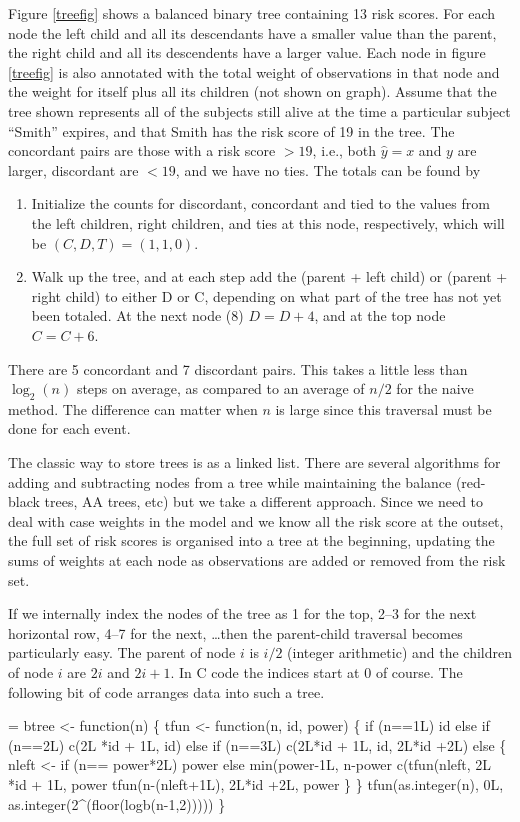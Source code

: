 \documentclass{article}
\begin{document}
Figure  \ref{treefig} shows a balanced binary tree containing  
13 risk scores.  For each node the left child and all its descendants
have a smaller value than the parent, the right child and all its
descendents have a larger value.
Each node in figure \ref{treefig} is also annotated with the total weight
of observations in that node and the weight for itself plus all its children 
(not shown on graph).  
Assume that the tree shown represents all of the subjects still alive at the
time a particular subject ``Smith'' expires, and that Smith has the risk score
of 19 in the tree.
The concordant pairs are those with a risk score $>19$, i.e., both $\hat y=x$
and $y$ are larger, discordant are $<19$, and we have no ties.
The totals can be found by
\begin{enumerate}
  \item Initialize the counts for discordant, concordant and tied to the
    values from the left children, right children, and ties at this node,
    respectively, which will be $(C,D,T) = (1,1,0)$.
  \item Walk up the tree, and at each step add the (parent + left child) or
    (parent + right child) to either D or C, depending on what part of the
    tree has not yet been totaled.  
    At the next node (8) $D= D+4$, and at the top node $C=C + 6$.
\end{enumerate}

There are 5 concordant and 7 discordant pairs.
This takes a little less than $\log_2(n)$ steps on average, as compared to an
average of $n/2$ for the naive method.  The difference can matter when $n$ is
large since this traversal must be done for each event.

The classic way to store trees is as a linked list.  There are several 
algorithms for adding and subtracting nodes from a tree while maintaining
the balance (red-black trees, AA trees, etc) but we take a different 
approach.  Since we need to deal with case weights in the model and we
know all the risk score at the outset, the full set of risk scores is
organised into a tree at the beginning, updating the sums of weights at
each node as observations are added or removed from the risk set.

If we internally index the nodes of the tree as 1 for the top, 
2--3 for the next 
horizontal row, 4--7 for the next, \ldots then the parent-child 
traversal becomes particularly easy.
The parent of node $i$ is $i/2$ (integer arithmetic) and the children of
node $i$ are $2i$ and $2i +1$.  In C code the indices start at 0 of course.
The following bit of code arranges data into such a tree.
\begin{nwchunk}
=
 btree <- function(n) \{
    tfun <- function(n, id, power) \{
        if (n==1L) id
        else if (n==2L) c(2L *id + 1L, id)
        else if (n==3L) c(2L*id + 1L, id, 2L*id +2L)
        else \{
            nleft <- if (n== power*2L) power  else min(power-1L, n-power%
            c(tfun(nleft, 2L *id + 1L, power%
              tfun(n-(nleft+1L), 2L*id +2L, power%
        \}
    \}
    tfun(as.integer(n), 0L, as.integer(2^(floor(logb(n-1,2)))))
 \}
\end{nwchunk}
\end{document}
